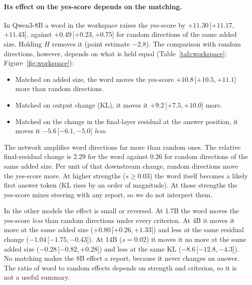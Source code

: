\documentclass[11pt]{article}
\newcommand{\ci}[3]{\ensuremath{#1}\,[\ensuremath{#2},\allowbreak\,\ensuremath{#3}]}
\newcommand{\ys}{yes-score}
\begin{document}
\paragraph{Its effect on the \ys{} depends on the matching.} In Qwen3-8B a word in the workspace raises the \ys{} by \ci{+11.30}{+11.17}{+11.43}, against \ci{+0.49}{+0.23}{+0.75} for random directions of the same added size. Holding $H$ removes it (point estimate $-2.8$). The comparison with random directions, however, depends on what is held equal (Table~\ref{tab:workspace}; Figure~\ref{fig:workspace}):
\begin{itemize}
  \item Matched on added size, the word moves the \ys{} \ci{+10.8}{+10.5}{+11.1} more than random directions.
  \item Matched on output change (KL), it moves it \ci{+9.2}{+7.5}{+10.0} more.
  \item Matched on the change in the final-layer residual at the answer position, it moves it \ci{-5.6}{-6.1}{-5.0} \emph{less}.
\end{itemize}
The network amplifies word directions far more than random ones. The relative final-residual change is 2.29 for the word against 0.26 for random directions of the same added size. Per unit of that downstream change, random directions move the \ys{} more. At higher strengths ($s\geq 0.03$) the word itself becomes a likely first answer token (KL rises by an order of magnitude). At those strengths the \ys{} mixes steering with any report, so we do not interpret them.

In the other models the effect is small or reversed. At 1.7B the word moves the \ys{} \emph{less} than random directions under every criterion. At 4B it moves it more at the same added size (\ci{+0.80}{+0.26}{+1.33}) and less at the same residual change (\ci{-1.04}{-1.75}{-0.43}). At 14B ($s=0.02$) it moves it no more at the same added size (\ci{-0.28}{-0.82}{+0.28}) and less at the same KL (\ci{-8.6}{-12.8}{-4.3}). No matching makes the 8B effect a report, because it never changes an answer. The ratio of word to random effects depends on strength and criterion, so it is not a useful summary.
\end{document}
